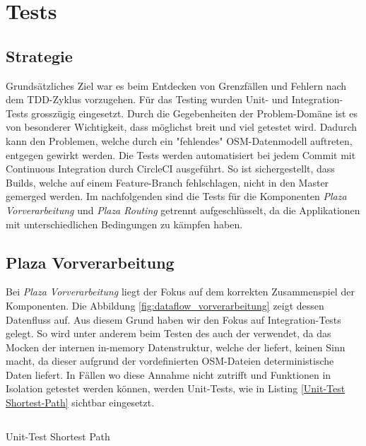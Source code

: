 
\section{Tests}
\label{sec:Tests}

\subsection{Strategie}
\label{test:Strategie}
Grundsätzliches Ziel war es beim Entdecken von Grenzfällen und Fehlern nach dem \ac{TDD}-Zyklus vorzugehen. Für das Testing wurden Unit- und Integration-Tests grosszügig eingesetzt. Durch die Gegebenheiten der Problem-Domäne ist es von besonderer Wichtigkeit, dass möglichst breit und viel getestet wird. Dadurch kann den Problemen, welche durch ein "fehlendes" \ac{OSM}-Datenmodell auftreten, entgegen gewirkt werden.  Die Tests werden automatisiert bei jedem Commit mit Continuous Integration durch CircleCI \cite{circleci} ausgeführt. So ist sichergestellt, dass Builds, welche auf einem Feature-Branch fehlschlagen, nicht in den Master gemerged werden. Im nachfolgenden sind die Tests für die Komponenten \emph{Plaza Vorverarbeitung} und \emph{Plaza Routing} getrennt aufgeschlüsselt, da die Applikationen mit unterschiedlichen Bedingungen zu kämpfen haben. 


\subsection{Plaza Vorverarbeitung}
\label{test:Plaza Vorverarbeitung}
Bei \emph{Plaza Vorverarbeitung} liegt der Fokus auf dem korrekten Zusammenspiel der Komponenten. Die Abbildung \ref{fig:dataflow_vorverarbeitung} zeigt dessen Datenfluss auf. Aus diesem Grund haben wir den Fokus auf Integration-Tests gelegt. So wird unter anderem beim Testen des  auch der  verwendet, da das Mocken der internen in-memory Datenstruktur, welche der  liefert, keinen Sinn macht, da dieser aufgrund der vordefinierten \ac{OSM}-Dateien deterministische Daten liefert. In Fällen wo diese Annahme nicht zutrifft und Funktionen in Isolation getestet werden können, werden Unit-Tests, wie in Listing \ref{Unit-Test Shortest-Path} sichtbar eingesetzt.

\begin{listing}[ht]
    \inputminted{python}{projectdoc/listing/test_compute_dijkstra_shortest_paths.py}
    \caption{Unit-Test Shortest Path}
    \label{Unit-Test Shortest-Path}
\end{listing}


